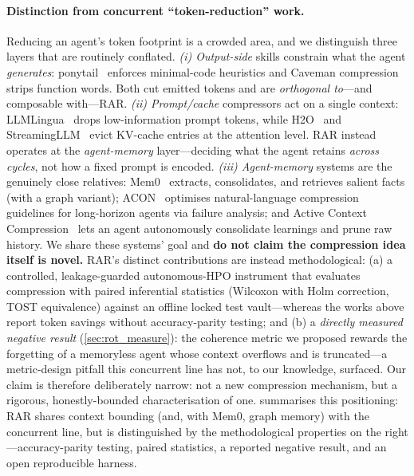 \documentclass[conference]{IEEEtran}
\begin{document}
\paragraph{Distinction from concurrent ``token-reduction'' work.}
Reducing an agent's token footprint is a crowded area, and we distinguish three layers that are routinely conflated. \emph{(i) Output-side} skills constrain what the agent \emph{generates}: ponytail~\citep{gebert2026ponytail} enforces minimal-code heuristics and Caveman compression~\citep{peltomaki2026caveman} strips function words. Both cut emitted tokens and are \emph{orthogonal to}---and composable with---RAR. \emph{(ii) Prompt/cache} compressors act on a single context: LLMLingua~\citep{jiang2023llmlingua} drops low-information prompt tokens, while H2O~\citep{zhang2023h2o} and StreamingLLM~\citep{xiao2023efficient} evict KV-cache entries at the attention level. RAR instead operates at the \emph{agent-memory} layer---deciding what the agent retains \emph{across cycles}, not how a fixed prompt is encoded. \emph{(iii) Agent-memory} systems are the genuinely close relatives: Mem0~\citep{chhikara2025mem0} extracts, consolidates, and retrieves salient facts (with a graph variant); ACON~\citep{kang2025acon} optimises natural-language compression guidelines for long-horizon agents via failure analysis; and Active Context Compression~\citep{verma2026focus} lets an agent autonomously consolidate learnings and prune raw history. We share these systems' goal and \textbf{do not claim the compression idea itself is novel.} RAR's distinct contributions are instead methodological: (a) a controlled, leakage-guarded autonomous-HPO instrument that evaluates compression with paired inferential statistics (Wilcoxon with Holm correction, TOST equivalence) against an offline locked test vault---whereas the works above report token savings without accuracy-parity testing; and (b) a \emph{directly measured negative result} (\cref{sec:rot_measure}): the coherence metric we proposed rewards the forgetting of a memoryless agent whose context overflows and is truncated---a metric-design pitfall this concurrent line has not, to our knowledge, surfaced. Our claim is therefore deliberately narrow: not a new compression mechanism, but a rigorous, honestly-bounded characterisation of one.  summarises this positioning: RAR shares context bounding (and, with Mem0, graph memory) with the concurrent line, but is distinguished by the methodological properties on the right---accuracy-parity testing, paired statistics, a reported negative result, and an open reproducible harness.
\end{document}
